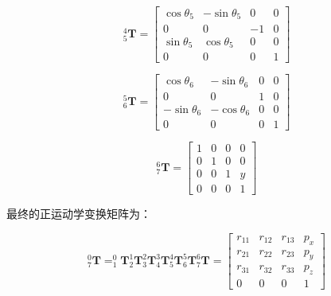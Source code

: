 \documentclass{homework}
\begin{document}
\begin{sol}
\[
  _5^4\mathbf{T} =
  \begin{bmatrix}
    \cos\theta_5 & -\sin\theta_5 & 0 & 0 \\
    0 & 0 & -1 & 0 \\
    \sin\theta_5 & \cos\theta_5 & 0 & 0 \\
    0 & 0 & 0 & 1
  \end{bmatrix}
\]

\[
  _6^5\mathbf{T} =
  \begin{bmatrix}
    \cos\theta_6 & -\sin\theta_6 & 0 & 0 \\
    0 & 0 & 1 & 0 \\
    -\sin\theta_6 & -\cos\theta_6 & 0 & 0 \\
    0 & 0 & 0 & 1
  \end{bmatrix}
\]

\[
  _7^6\mathbf{T} =
  \begin{bmatrix}
    1 & 0 & 0 & 0 \\
    0 & 1 & 0 & 0 \\
    0 & 0 & 1 & y \\
    0 & 0 & 0 & 1
  \end{bmatrix}
\]

最终的正运动学变换矩阵为：

\[
  _7^0\mathbf{T} = _1^0\mathbf{T} _2^1\mathbf{T} _3^2\mathbf{T} _4^3\mathbf{T} _5^4\mathbf{T} _6^5\mathbf{T} _7^6\mathbf{T} =
  \begin{bmatrix} 
r_{11} & r_{12} & r_{13} & p_x \\ 
r_{21} & r_{22} & r_{23} & p_y \\ 
r_{31} & r_{32} & r_{33} & p_z \\ 
0 & 0 & 0 & 1
\end{bmatrix}
\] 


\end{sol}
\end{document}
